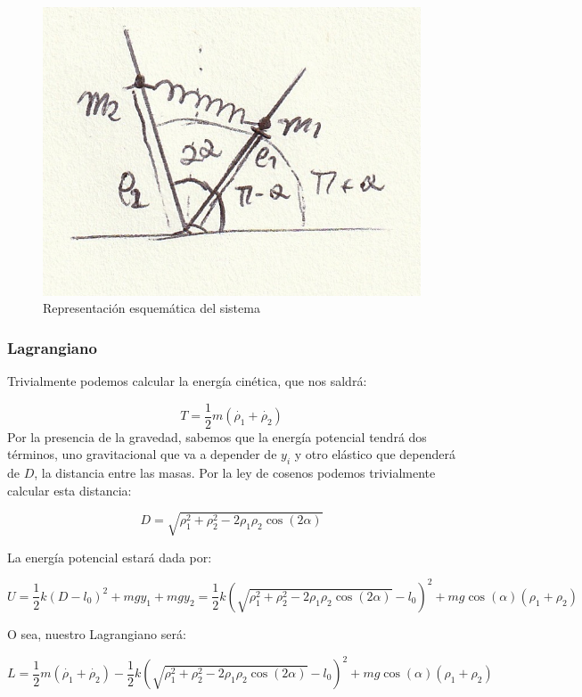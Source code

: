 \documentclass[a4paper,12pt]{article}
\begin{document}
\begin{figure}[h!]
  \centering
  \caption{Representación esquemática del sistema}
  \label{repr}
  \includegraphics{repr.jpg}
\end{figure}

\subsubsection*{Lagrangiano}
Trivialmente podemos calcular la energía cinética, que nos saldrá:

\begin{equation}
  T = \frac{1}{2}m (\dot{\rho_1} + \dot{\rho_2})
\end{equation}
Por la presencia de la gravedad, sabemos que la energía potencial tendrá dos términos, uno gravitacional que va a depender de $y_i$ y otro elástico que dependerá de $D$, la distancia entre las masas. Por la ley de cosenos podemos trivialmente calcular esta distancia:

$$D =\sqrt{\rho_1^2 + \rho_2^2 -2\rho_1\rho_2\cos{(2\alpha)}} $$


La energía potencial estará dada por:

$$U = \frac{1}{2}k(D-l_0)^2 + mgy_1+mgy_2 = \frac{1}{2}k \left(\sqrt{\rho_1^2 + \rho_2^2 -2\rho_1\rho_2\cos{(2\alpha)}} - l_0\right)^2 + mg\cos{(\alpha)}\left(\rho_1+\rho_2\right)$$




O sea, nuestro Lagrangiano será:

\begin{equation}
  L = \frac{1}{2}m (\dot{\rho_1} + \dot{\rho_2}) - \frac{1}{2}k (\sqrt{\rho_1^2 + \rho_2^2 -2\rho_1\rho_2\cos{(2\alpha)}} - l_0)^2 + mg\cos{(\alpha)}\left(\rho_1+\rho_2\right)
\end{equation}
\end{document}
